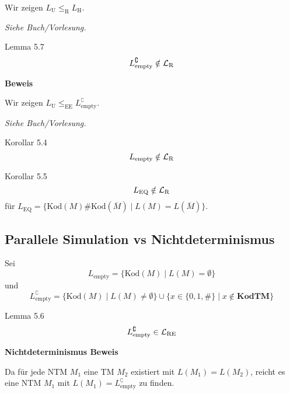                 Wir zeigen $L_{\text{U}} \leq_{\text{R}} L_{\text{H}}$.
            
                \textit{Siehe Buch/Vorlesung.}
            
                
                \begin{mainbox}{Lemma 5.7}
                    $$L_{\text{empty}}^\complement \notin \mathcal{L}_\text{R}$$
                \end{mainbox}
                \textbf{Beweis }
            
                Wir zeigen $L_{\text{U}} \leq_{\text{EE}} L_{\text{empty}}^\complement$.
            
                \textit{Siehe Buch/Vorlesung.}
               
            
                \begin{subbox}{Korollar 5.4}
                    $$L_{\text{empty}} \notin \mathcal{L}_\text{R}$$
                \end{subbox}
                \begin{subbox}{Korollar 5.5}
                    $$L_{\text{EQ}} \notin \mathcal{L}_\text{R}$$
                    für $L_{\text{EQ}} = \{\text{Kod}(M)\#\text{Kod}(\overline{M}) \mid L(M) = L(\overline{M})\}$.
                \end{subbox}
            
            
            
                \subsection{Parallele Simulation vs Nichtdeterminismus}
                Sei 
                $$L_{\text{empty}} = \{\text{Kod}(M) \mid L(M) = \emptyset\}$$
                und 
                $$L_{\text{empty}}^\complement = \{\text{Kod}(M) \mid L(M) \neq \emptyset\} \cup \{x \in \{0,1, \#\}\mid x \notin \textbf{KodTM}\}$$
                \begin{mainbox}{Lemma 5.6}
                    $$L_{\text{empty}}^\complement \in \mathcal{L}_\text{RE}$$
                \end{mainbox}

                \textbf{Nichtdeterminismus Beweis}
            
                Da für jede NTM $M_1$ eine TM $M_2$ existiert mit $L(M_1) = L(M_2)$, reicht es eine NTM $M_1$ mit $L(M_1) = L_{\text{empty}}^\complement$ zu finden.
            
